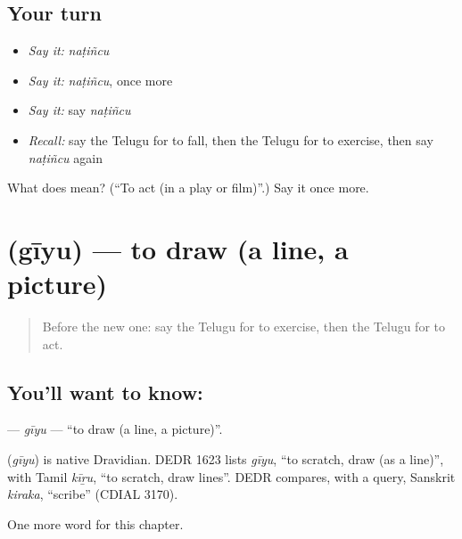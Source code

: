 \subsection*{Your turn}
\begin{itemize}
\raggedright
  \item \emph{Say it:} \emph{naṭiñcu}
  \item \emph{Say it:} \emph{naṭiñcu}, once more
  \item \emph{Say it:} say \emph{naṭiñcu}
  \item \emph{Recall:} say the Telugu for to fall, then the Telugu for to exercise, then say \emph{naṭiñcu} again
\end{itemize}

\begin{tcolorbox}[breakable,colback=teal!4,colframe=teal!35!black,title={Before you move on}]
What does  mean? (\textquotedblleft{}To act (in a play or film)\textquotedblright{}.) Say it once more.
\end{tcolorbox}
\section[\texorpdfstring{\te{గీయు} (gīyu)}{గీయు (gīyu)}]{ (gīyu) — to draw (a line, a picture)}

\label{lesson:TE-C204-giyu}



\begin{quote}
Before the new one: say the Telugu for to exercise, then the Telugu for to act.
\end{quote}

\subsection*{You'll want to know: }
\textbf{} — \emph{gīyu} — \textquotedblleft{}to draw (a line, a picture)\textquotedblright{}.

\begin{cousinweb}
\textbf{} (\emph{gīyu}) is native Dravidian. DEDR 1623 lists \emph{gīyu}, \textquotedblleft{}to scratch, draw (as a line)\textquotedblright{}, with Tamil \emph{kīṟu}, \textquotedblleft{}to scratch, draw lines\textquotedblright{}. DEDR compares, with a query, Sanskrit \emph{kiraka}, \textquotedblleft{}scribe\textquotedblright{} (CDIAL 3170).
\end{cousinweb}

\begin{grammarlens}[title={What you've built}]
One more word for this chapter.
\end{grammarlens}

